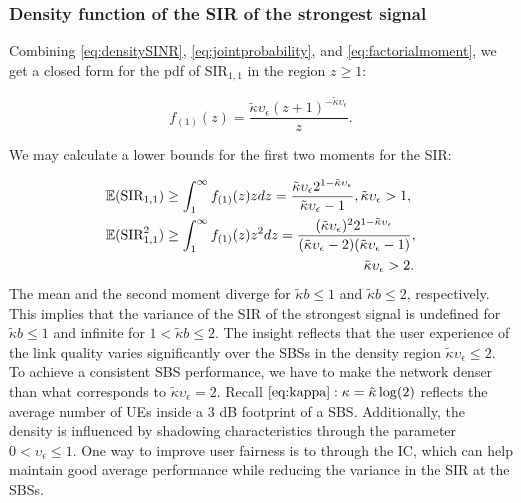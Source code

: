 \documentclass[lettersize,journal]{IEEEtran}
\begin{document}
\subsubsection{Density function of the SIR of the strongest signal}
Combining \eqref{eq:densitySINR}, \eqref{eq:jointprobability}, and \eqref{eq:factorialmoment}, we get a closed form for the pdf of SIR$_{1,1}$ in the region $z\geq 1$:


\begin{equation}
  \label{eq:SIR1}
  f_{(1)}(z) = \frac {\tilde{\kappa}\upsilon_{\epsilon}\left({z + 1} \right)^{-\tilde{\kappa}\upsilon_{\epsilon}}} {z}.
\end{equation}



We may calculate a lower bounds for the first two moments for the SIR:


\begin{align}
  &\mathbb{E}(\text{SIR}_{1,1})  \geq\int_{1}^{\infty}f_{(1)}(z)zdz=\frac{\tilde{\kappa}\upsilon_{\epsilon}2^{1-\tilde{\kappa}\upsilon_{\epsilon} }}{\tilde{\kappa}\upsilon_{\epsilon}-1}, \tilde{\kappa}\upsilon_{\epsilon} >1, \\
  &\mathbb{E}(\text{SIR}^2_{1,1}) \geq \int_{1}^{\infty}f_{(1)}(z)z^2dz = \frac{(\tilde{\kappa}\upsilon_{\epsilon}) ^2 2^{1-\tilde{\kappa}\upsilon_{\epsilon} }}{(\tilde{\kappa}\upsilon_{\epsilon} - 2)  (\tilde{\kappa}\upsilon_{\epsilon} - 1)}, \nonumber\\
  &\hspace{6.5cm}\tilde{\kappa}\upsilon_{\epsilon}>2 .
\end{align}
The mean and the second moment diverge for $\tilde{\kappa}b\leq 1$ and $\tilde{\kappa}b\leq 2$, respectively. This implies that the variance of the SIR of the strongest signal is undefined for $\tilde{\kappa}b \leq 1$ and infinite for $1 <\tilde{\kappa}b \leq 2$. The insight reflects that the user experience of the link quality varies significantly over the SBSs in the density region $\tilde{\kappa} \upsilon_{\epsilon} \leq 2$. To achieve a consistent SBS performance, we have to make the network denser than what corresponds to $\tilde{\kappa} \upsilon_{\epsilon} =2$. Recall $\eqref{eq:kappa}: \kappa = \tilde{\kappa}\log(2)$ reflects the average number of UEs inside a $3$ dB footprint of a SBS.  Additionally, the density is influenced by shadowing characteristics through the parameter  $0<\upsilon_{\epsilon} \leq 1$. One way to improve user fairness is to through the IC, which can help maintain good average performance while reducing the variance in the SIR at the SBSs.
\end{document}
